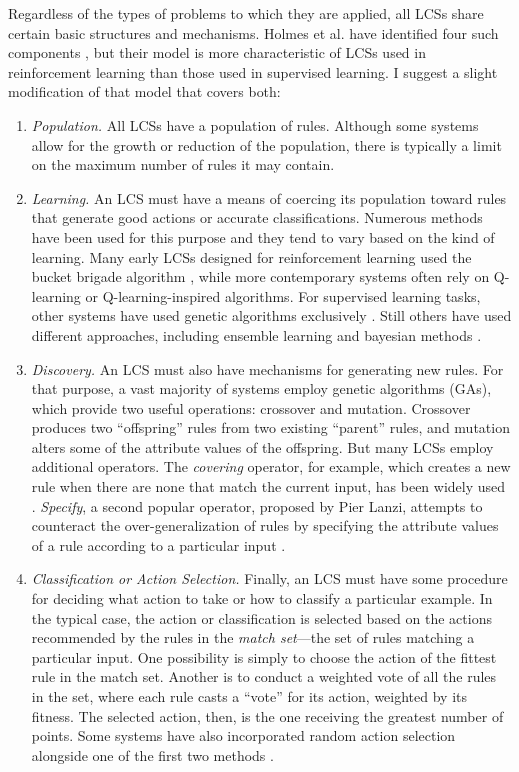 \documentclass[12pt]{article}
\begin{document}
Regardless of the types of problems to which they are applied, all LCSs share certain basic structures and mechanisms. Holmes et al. have identified four such components  \cite{holmes_learning_2002}, but their model is more characteristic of LCSs used in reinforcement learning than those used in supervised learning. I suggest a slight modification of that model that covers both:
\begin{enumerate}
\item \emph{Population.} All LCSs have a population of rules. Although some systems allow for the growth or reduction of the population, there is typically a limit on the maximum number of rules it may contain.
\item \emph{Learning.} An LCS must have a means of coercing its population toward rules that generate good actions or accurate classifications. Numerous methods have been used for this purpose and they tend to vary based on the kind of learning. Many early LCSs designed for reinforcement learning used the bucket brigade algorithm \cite{holland_properties_1985}, while more contemporary systems often rely on Q-learning \cite{c._j._c._h._learning_1989, orriols-puig_fuzzy-ucs:_2009} or Q-learning-inspired algorithms. For supervised learning tasks, other systems have used genetic algorithms exclusively \cite{llora_towards_2007}. Still others have used different approaches, including ensemble learning \cite{gao_learning_2005} and bayesian methods \cite{hai_h._dam_bcs:_2006}.
\item \emph{Discovery.} An LCS must also have mechanisms for generating new rules. For that purpose, a vast majority of systems employ genetic algorithms (GAs), which provide two useful operations: crossover and mutation. Crossover produces two ``offspring'' rules from two existing ``parent'' rules, and mutation alters some of the attribute values of the offspring. But many LCSs employ additional operators. The \emph{covering} operator, for example, which creates a new rule when there are none that match the current input, has been widely used \cite{orriols-puig_fuzzy-ucs:_2009, wilson_classifier_1995, bernado-mansilla_accuracy-based_2003}. \emph{Specify}, a second popular operator, proposed by Pier Lanzi,  attempts to counteract the over-generalization of rules by specifying the attribute values of a rule according to a particular input \cite{lanzi_study_1997}. 
\item \emph{Classification or Action Selection.} Finally, an LCS must have some procedure for deciding what action to take or how to classify a particular example. In the typical case, the action or classification is selected based on the actions recommended by the rules in the \emph{match set}---the set of rules matching a particular input. One possibility is simply to choose the action of the fittest rule in the match set. Another is to conduct a weighted vote of all the rules in the set, where each rule casts a ``vote'' for its action, weighted by its fitness. The selected action, then, is the one receiving the greatest number of points. Some systems have also incorporated random action selection alongside one of the first two methods \cite{wilson_classifier_1995}.
\end{enumerate}
\end{document}
